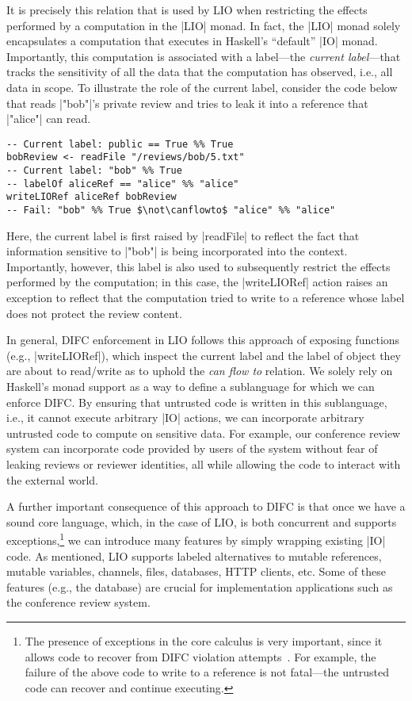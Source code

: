 It is precisely this relation that is used by LIO when restricting the
effects performed by a computation in the \hs|LIO| monad.
%
In fact, the \hs|LIO| monad solely encapsulates a computation that
executes in Haskell's ``default'' \hs|IO| monad.
%
Importantly, this computation is associated with a label---the
\emph{current label}---that tracks the sensitivity of all the data
that the computation has observed, i.e., all data in scope.
%
To illustrate the role of the current label, consider the code below
that reads \hs|"bob"|'s private review and tries to leak it into a
reference that \hs|"alice"| can read.
\begin{verbatim}
-- Current label: public == True %% True
bobReview <- readFile "/reviews/bob/5.txt"
-- Current label: "bob" %% True
-- labelOf aliceRef == "alice" %% "alice"
writeLIORef aliceRef bobReview
-- Fail: "bob" %% True $\not\canflowto$ "alice" %% "alice"
\end{verbatim}
%
Here, the current label is first raised by \hs|readFile| to reflect
the fact that information sensitive to \hs|"bob"| is being
incorporated into the context.
%
Importantly, however, this label is also used to subsequently restrict
the effects performed by the computation; in this case, the
\hs|writeLIORef| action raises an exception to reflect that
the computation tried to write to a reference whose label
does not protect the review content.

In general, DIFC enforcement in LIO follows this approach of exposing
functions (e.g., \hs|writeLIORef|), which inspect the current label
and the label of object they are about to read/write as to uphold the
\emph{can flow to} relation.
%
We solely rely on Haskell's monad support as a way to define a
sublanguage for which we can enforce DIFC.
%
By ensuring that untrusted code is written in this sublanguage, i.e.,
it cannot execute arbitrary \hs|IO| actions, we can incorporate
arbitrary untrusted code to compute on sensitive data.
%
For example, our conference review system can incorporate code
provided by users of the system without fear of leaking reviews or
reviewer identities, all while allowing the code to interact with the
external world.

A further important consequence of this approach to DIFC is that once
we have a sound core language, which, in the case of LIO, is both
concurrent and supports exceptions,\footnote{
  The presence of exceptions in the core calculus is very important,
  since it allows code to recover from DIFC violation
  attempts~\cite{Breeze, stefan:2012:arxiv-flexible}.
  For example, the failure of the above code to write to a reference
  is not fatal---the untrusted code can recover and continue
  executing.
  
}
we can introduce many features by simply wrapping existing \hs|IO|
code.
%
As mentioned, LIO supports labeled alternatives to mutable references,
mutable variables, channels, files, databases, HTTP clients, etc.
%
Some of these features (e.g., the database) are crucial for
implementation applications such as the conference review system.

